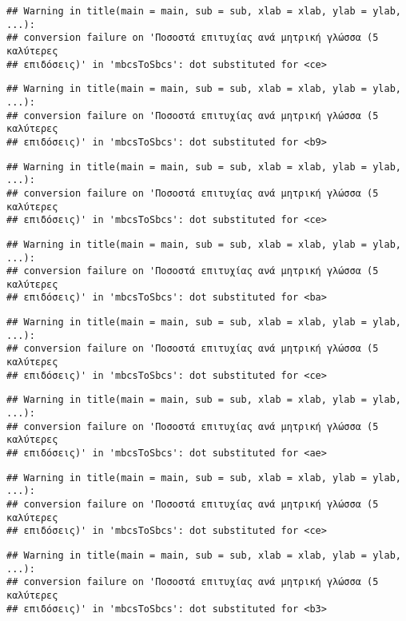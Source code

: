 \documentclass[
]{article}
\begin{document}
\begin{verbatim}
## Warning in title(main = main, sub = sub, xlab = xlab, ylab = ylab, ...):
## conversion failure on 'Ποσοστά επιτυχίας ανά μητρική γλώσσα (5 καλύτερες
## επιδόσεις)' in 'mbcsToSbcs': dot substituted for <ce>
\end{verbatim}

\begin{verbatim}
## Warning in title(main = main, sub = sub, xlab = xlab, ylab = ylab, ...):
## conversion failure on 'Ποσοστά επιτυχίας ανά μητρική γλώσσα (5 καλύτερες
## επιδόσεις)' in 'mbcsToSbcs': dot substituted for <b9>
\end{verbatim}

\begin{verbatim}
## Warning in title(main = main, sub = sub, xlab = xlab, ylab = ylab, ...):
## conversion failure on 'Ποσοστά επιτυχίας ανά μητρική γλώσσα (5 καλύτερες
## επιδόσεις)' in 'mbcsToSbcs': dot substituted for <ce>
\end{verbatim}

\begin{verbatim}
## Warning in title(main = main, sub = sub, xlab = xlab, ylab = ylab, ...):
## conversion failure on 'Ποσοστά επιτυχίας ανά μητρική γλώσσα (5 καλύτερες
## επιδόσεις)' in 'mbcsToSbcs': dot substituted for <ba>
\end{verbatim}

\begin{verbatim}
## Warning in title(main = main, sub = sub, xlab = xlab, ylab = ylab, ...):
## conversion failure on 'Ποσοστά επιτυχίας ανά μητρική γλώσσα (5 καλύτερες
## επιδόσεις)' in 'mbcsToSbcs': dot substituted for <ce>
\end{verbatim}

\begin{verbatim}
## Warning in title(main = main, sub = sub, xlab = xlab, ylab = ylab, ...):
## conversion failure on 'Ποσοστά επιτυχίας ανά μητρική γλώσσα (5 καλύτερες
## επιδόσεις)' in 'mbcsToSbcs': dot substituted for <ae>
\end{verbatim}

\begin{verbatim}
## Warning in title(main = main, sub = sub, xlab = xlab, ylab = ylab, ...):
## conversion failure on 'Ποσοστά επιτυχίας ανά μητρική γλώσσα (5 καλύτερες
## επιδόσεις)' in 'mbcsToSbcs': dot substituted for <ce>
\end{verbatim}

\begin{verbatim}
## Warning in title(main = main, sub = sub, xlab = xlab, ylab = ylab, ...):
## conversion failure on 'Ποσοστά επιτυχίας ανά μητρική γλώσσα (5 καλύτερες
## επιδόσεις)' in 'mbcsToSbcs': dot substituted for <b3>
\end{verbatim}
\end{document}
